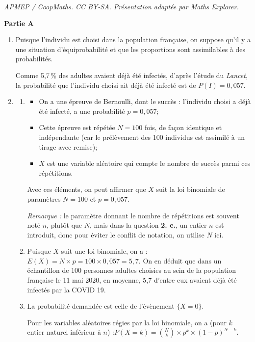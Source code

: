 \documentclass[10pt]{article}
\begin{document}
\noindent\textit{APMEP / CoopMaths. CC BY-SA. Présentation adaptée par Maths Explorer.}\par\medskip
\medskip
\textbf{Partie A}
\medskip
\begin{enumerate}
	\item Puisque l'individu est choisi dans la population française, on suppose qu'il y a une situation d'équiprobabilité et que les proportions sont assimilables à des probabilités.

Comme 5,7\,\% des adultes avaient déjà été infectés, d'après l'étude du \emph{Lancet}, la probabilité que l'individu choisi ait déjà été infecté est de $P(I) = 0,057$.

	\item \begin{enumerate}
		\item \begin{itemize}
			\item On a une épreuve de Bernoulli, dont le succès : \og l'individu choisi a déjà été infecté\fg{}, a une probabilité $p = 0,057$;
			\item Cette épreuve est répétée $N = 100$ fois, de façon identique et indépendante (car le prélèvement des 100 individus est assimilé à un tirage avec remise);
			\item $X$ est une variable aléatoire qui compte le nombre de succès parmi ces répétitions.
		\end{itemize}

		Avec ces éléments, on peut affirmer que $X$ suit la loi binomiale de paramètres $N = 100$ et $p = 0,057$.

		\emph{Remarque :} le paramètre donnant le nombre de répétitions est souvent noté $n$, plutôt que $N$, mais dans la question \textbf{2. e.}, un entier $n$ est introduit, donc pour éviter le conflit de notation, on utilise $N$ ici.

		\item Puisque $X$ suit une loi binomiale, on a :\quad $E(X) = N\times p = 100\times 0,057 = 5,7$. On en déduit que dans un échantillon de 100 personnes adultes choisies au sein de la population française le  11 mai 2020, en moyenne, 5,7 d'entre eux avaient déjà été infectés par la COVID 19.

		\item La probabilité demandée est celle de l'évènement $\{X = 0\}$.

Pour les variables aléatoires régies par la loi binomiale, on a (pour $k$ entier naturel inférieur à $n$) :\quad $P(X = k) = \displaystyle \binom{N}{k} \times p^k \times (1 - p)^{N-k}$.


\end{enumerate}
\end{enumerate}
\end{document}
